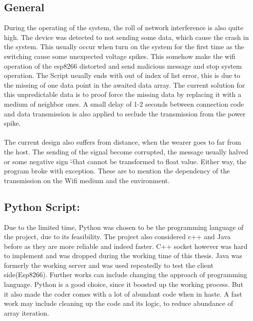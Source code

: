 \documentclass[12 pt, a4paper]{thesis}
\begin{document}
\subsection{General}
During the operating of the system, the roll of network interference is also quite high. The device was detected to not sending some data, which cause the crash in the system. This usually occur when turn on the system for the first time as the switching cause some unexpected voltage spikes. This somehow make the wifi operation of the esp8266 distorted and send malicious message and stop system operation. The Script usually ends with out of index of list error, this is due to the missing of one data point in the awaited data array. The current solution for this unpredictable data is to proof force the missing data by replacing it with a medium of neighbor ones. A small delay of 1-2 seconds between connection code and data transmission is also applied to seclude the transmission from the power spike.\\
\\
The current design also suffers from distance, when the wearer goes to far from the host. The sending of the signal become corrupted, the message usually halved or some negative sign \"-\" that cannot be transformed to float value. Either way, the program broke with exception. These are to mention the dependency of the transmission on the Wifi medium and the environment.  
\subsection{Python Script:}
Due to the limited time, Python was chosen to be the programming language of the project, due to its feasibility. The project also considered c++ and Java before as they are more reliable and indeed faster. C++ socket however was hard to implement and was dropped during the working time of this thesis. Java was formerly the working server and was used repeatedly to test the client side(Esp8266). Further works can include changing the approach of programming language. Python is a good choice, since it boosted up the working process. But it also made the coder comes with a lot of abundant code when in haste. A fast work may include cleaning up the code and its logic, to reduce abundance of array iteration.\\
\end{document}
